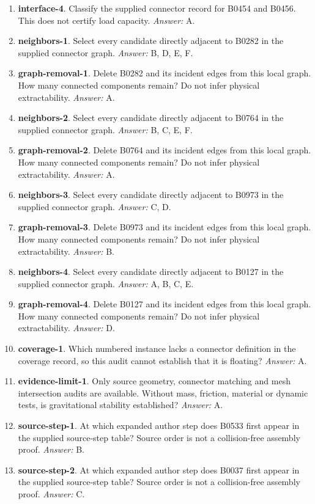 \begin{enumerate}
\item \textbf{interface-4}. Classify the supplied connector record for B0454 and B0456. This does not certify load capacity. \textit{Answer:} A.
\item \textbf{neighbors-1}. Select every candidate directly adjacent to B0282 in the supplied connector graph. \textit{Answer:} B, D, E, F.
\item \textbf{graph-removal-1}. Delete B0282 and its incident edges from this local graph. How many connected components remain? Do not infer physical extractability. \textit{Answer:} A.
\item \textbf{neighbors-2}. Select every candidate directly adjacent to B0764 in the supplied connector graph. \textit{Answer:} B, C, E, F.
\item \textbf{graph-removal-2}. Delete B0764 and its incident edges from this local graph. How many connected components remain? Do not infer physical extractability. \textit{Answer:} A.
\item \textbf{neighbors-3}. Select every candidate directly adjacent to B0973 in the supplied connector graph. \textit{Answer:} C, D.
\item \textbf{graph-removal-3}. Delete B0973 and its incident edges from this local graph. How many connected components remain? Do not infer physical extractability. \textit{Answer:} B.
\item \textbf{neighbors-4}. Select every candidate directly adjacent to B0127 in the supplied connector graph. \textit{Answer:} A, B, C, E.
\item \textbf{graph-removal-4}. Delete B0127 and its incident edges from this local graph. How many connected components remain? Do not infer physical extractability. \textit{Answer:} D.
\item \textbf{coverage-1}. Which numbered instance lacks a connector definition in the coverage record, so this audit cannot establish that it is floating? \textit{Answer:} A.
\item \textbf{evidence-limit-1}. Only source geometry, connector matching and mesh intersection audits are available. Without mass, friction, material or dynamic tests, is gravitational stability established? \textit{Answer:} A.
\item \textbf{source-step-1}. At which expanded author step does B0533 first appear in the supplied source-step table? Source order is not a collision-free assembly proof. \textit{Answer:} B.
\item \textbf{source-step-2}. At which expanded author step does B0037 first appear in the supplied source-step table? Source order is not a collision-free assembly proof. \textit{Answer:} C.

\end{enumerate}
